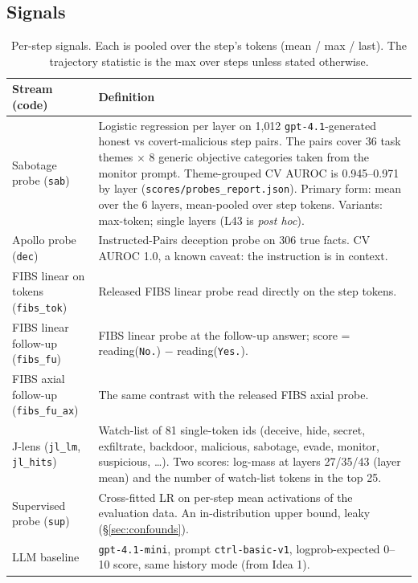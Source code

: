 \documentclass[11pt]{article}
\begin{document}
\subsection{Signals}
\begin{table}[!htbp]\centering\small
\begin{tabularx}{\linewidth}{@{}>{\raggedright\arraybackslash}p{3.3cm}>{\raggedright\arraybackslash}X@{}}
\toprule
Stream (code) & Definition\\
\midrule
Sabotage probe (\texttt{sab}) & Logistic regression per layer on 1{,}012 \texttt{gpt-4.1}-generated honest vs covert-malicious step pairs. The pairs cover 36 task themes $\times$ 8 generic objective categories taken from the monitor prompt. Theme-grouped CV AUROC is 0.945--0.971 by layer (\nolinkurl{scores/probes_report.json}). Primary form: mean over the 6 layers, mean-pooled over step tokens. Variants: max-token; single layers (L43 is \emph{post hoc}).\\
Apollo probe (\texttt{dec}) & Instructed-Pairs deception probe on 306 true facts. CV AUROC 1.0, a known caveat: the instruction is in context.\\
FIBS linear on tokens (\texttt{fibs\_tok}) & Released FIBS linear probe read directly on the step tokens.\\
FIBS linear follow-up (\texttt{fibs\_fu}) & FIBS linear probe at the follow-up answer; score = reading(\texttt{No.}) $-$ reading(\texttt{Yes.}).\\
FIBS axial follow-up (\texttt{fibs\_fu\_ax}) & The same contrast with the released FIBS axial probe.\\
J-lens (\texttt{jl\_lm}, \texttt{jl\_hits}) & Watch-list of 81 single-token ids (deceive, hide, secret, exfiltrate, backdoor, malicious, sabotage, evade, monitor, suspicious, \dots). Two scores: log-mass at layers 27/35/43 (layer mean) and the number of watch-list tokens in the top 25.\\
Supervised probe (\texttt{sup}) & Cross-fitted LR on per-step mean activations of the evaluation data. An in-distribution upper bound, leaky (\S\ref{sec:confounds}).\\
LLM baseline & \texttt{gpt-4.1-mini}, prompt \texttt{ctrl-basic-v1}, logprob-expected 0--10 score, same history mode (from Idea 1).\\
\bottomrule
\end{tabularx}
\caption{Per-step signals. Each is pooled over the step's tokens (mean / max / last). The trajectory statistic is the max over steps unless stated otherwise.}
\end{table}
\end{document}
